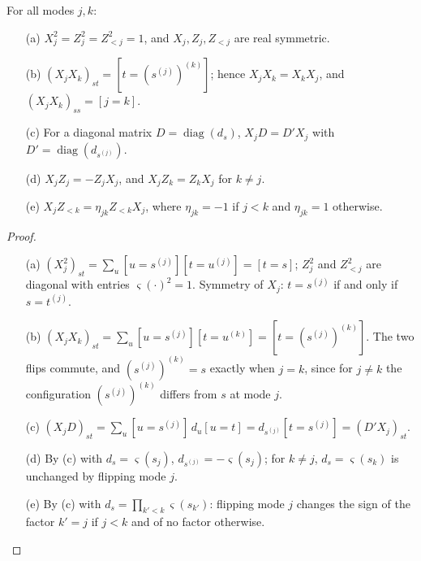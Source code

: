 \begin{lemma}\label{lem:pauli}
For all modes $j,k$:
\begin{enumerate}
\item[(a)] $X_j^2=Z_j^2=Z_{<j}^2=1$, and $X_j,Z_j,Z_{<j}$ are real symmetric.
\item[(b)] $(X_jX_k)_{st}=[t=(s^{(j)})^{(k)}]$; hence $X_jX_k=X_kX_j$, and
 $(X_jX_k)_{ss}=[j=k]$.
\item[(c)] For a diagonal matrix $D=\operatorname{diag}(d_s)$,
 $X_jD=D'X_j$ with $D'=\operatorname{diag}(d_{s^{(j)}})$.
\item[(d)] $X_jZ_j=-Z_jX_j$, and $X_jZ_k=Z_kX_j$ for $k\neq j$.
\item[(e)] $X_jZ_{<k}=\eta_{jk}Z_{<k}X_j$, where $\eta_{jk}=-1$ if $j<k$ and
 $\eta_{jk}=1$ otherwise.
\end{enumerate}
\end{lemma}
\begin{proof}
\begin{enumerate}
\item[(a)] $(X_j^2)_{st}=\sum_u[u=s^{(j)}][t=u^{(j)}]=[t=s]$; $Z_j^2$ and $Z_{<j}^2$ are
diagonal with entries $\varsigma(\cdot)^2=1$. Symmetry of $X_j$: $t=s^{(j)}$ if and only
if $s=t^{(j)}$.
\item[(b)] $(X_jX_k)_{st}=\sum_u[u=s^{(j)}][t=u^{(k)}]=[t=(s^{(j)})^{(k)}]$. The two
flips commute, and $(s^{(j)})^{(k)}=s$ exactly when $j=k$, since for $j\neq k$ the
configuration $(s^{(j)})^{(k)}$ differs from $s$ at mode $j$.
\item[(c)] $(X_jD)_{st}=\sum_u[u=s^{(j)}]\,d_u[u=t]=d_{s^{(j)}}[t=s^{(j)}]=(D'X_j)_{st}$.
\item[(d)] By (c) with $d_s=\varsigma(s_j)$, $d_{s^{(j)}}=-\varsigma(s_j)$; for $k\neq j$,
$d_s=\varsigma(s_k)$ is unchanged by flipping mode $j$.
\item[(e)] By (c) with $d_s=\prod_{k'<k}\varsigma(s_{k'})$: flipping mode $j$ changes the
sign of the factor $k'=j$ if $j<k$ and of no factor otherwise.
\end{enumerate}
\end{proof}

